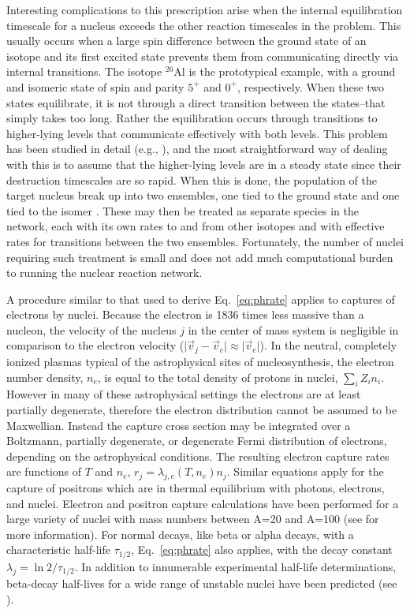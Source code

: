 \documentclass[12pt,modern,tighten,times,apj]{aastex61}
\begin{document}
Interesting complications to this prescription arise when the internal
equilibration timescale for a nucleus exceeds the other reaction
timescales in the problem.  This usually occurs when a large spin
difference between the ground state of an isotope and its first excited state
prevents them from communicating directly via internal transitions.
The isotope $^{26}$Al is the prototypical example, with a ground and isomeric state of spin and parity $5^+$ and $0^+$, respectively.  When these two states equilibrate, it is not through a direct transition between the states--that simply takes too long.  Rather the equilibration occurs
through transitions to higher-lying levels that communicate effectively
with both levels.  This problem has been studied in detail (e.g.,
\cite{WaFo80}), and the most straightforward way of dealing with this is
to assume that the higher-lying levels are in a steady state since their
destruction timescales are so rapid.  When this is done, the population of
the target nucleus break up into two ensembles, one tied to the ground
state and one tied to the isomer \cite{GuMe01}.  These may then be treated
as separate species in the network, each with its own rates to and from
other isotopes and with effective rates for transitions between the two
ensembles.  Fortunately, the number of nuclei requiring such treatment is
small and does not add much computational burden to running the nuclear
reaction network.

A procedure similar to that used to derive Eq.~\ref{eq:phrate} applies to captures of electrons by nuclei.  Because the electron is 1836 times less massive than a 
nucleon, the velocity of the nucleus $j$ in the center of mass system is 
negligible in comparison to the electron velocity ($\vert \vec v_j- \vec 
v_e \vert \approx \vert \vec v_e \vert$).  In the neutral, completely 
ionized plasmas typical of the astrophysical sites of nucleosynthesis, the 
electron number density, $n_{e}$, is equal to the total density of protons 
in nuclei, $\sum_i Z_i n_i$.  However in many of these astrophysical 
settings the electrons are at least partially degenerate, therefore the 
electron distribution cannot be assumed to be Maxwellian.  Instead the 
capture cross section may be integrated over a Boltzmann, partially 
degenerate, or degenerate Fermi distribution of electrons, depending on the 
astrophysical conditions.  The resulting electron capture rates are 
functions of $T$ and $n_e$, $r_j=\lambda_{j,e} (T,n_e) n_j.$  Similar equations apply for the capture of positrons which are in thermal equilibrium with photons, electrons, and nuclei.  Electron and positron capture calculations have been performed for a large variety of nuclei with mass numbers between A=20 and A=100 (see \cite{LiMF04} for more information). 
For normal decays, like beta or alpha decays, with a characteristic  half-life
$\tau_{1/2}$,  Eq.~\ref{eq:phrate} also applies, with the
decay constant  $\lambda_j=\ln 2/\tau_{1/2}$.  In addition to innumerable
experimental half-life determinations, beta-decay half-lives for a wide range of unstable nuclei have  been predicted (see \cite{Borz04,MoNK97}).
\end{document}
